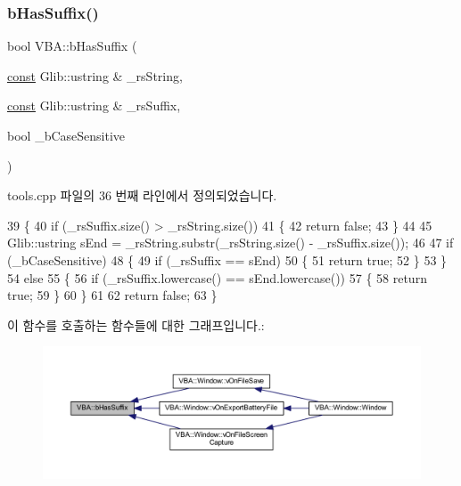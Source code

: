 \subsubsection{\texorpdfstring{b\+Has\+Suffix()}{bHasSuffix()}}
{\footnotesize\ttfamily bool V\+B\+A\+::b\+Has\+Suffix (\begin{DoxyParamCaption}\item[{\mbox{\hyperlink{getopt1_8c_a2c212835823e3c54a8ab6d95c652660e}{const}} Glib\+::ustring \&}]{\+\_\+rs\+String,  }\item[{\mbox{\hyperlink{getopt1_8c_a2c212835823e3c54a8ab6d95c652660e}{const}} Glib\+::ustring \&}]{\+\_\+rs\+Suffix,  }\item[{bool}]{\+\_\+b\+Case\+Sensitive }\end{DoxyParamCaption})}



tools.\+cpp 파일의 36 번째 라인에서 정의되었습니다.


\begin{DoxyCode}
39 \{
40   \textcolor{keywordflow}{if} (\_rsSuffix.size() > \_rsString.size())
41   \{
42     \textcolor{keywordflow}{return} \textcolor{keyword}{false};
43   \}
44 
45   Glib::ustring sEnd = \_rsString.substr(\_rsString.size() - \_rsSuffix.size());
46 
47   \textcolor{keywordflow}{if} (\_bCaseSensitive)
48   \{
49     \textcolor{keywordflow}{if} (\_rsSuffix == sEnd)
50     \{
51       \textcolor{keywordflow}{return} \textcolor{keyword}{true};
52     \}
53   \}
54   \textcolor{keywordflow}{else}
55   \{
56     \textcolor{keywordflow}{if} (\_rsSuffix.lowercase() == sEnd.lowercase())
57     \{
58       \textcolor{keywordflow}{return} \textcolor{keyword}{true};
59     \}
60   \}
61 
62   \textcolor{keywordflow}{return} \textcolor{keyword}{false};
63 \}
\end{DoxyCode}
이 함수를 호출하는 함수들에 대한 그래프입니다.\+:
\nopagebreak
\begin{figure}[H]
\begin{center}
\leavevmode
\includegraphics[width=350pt]{namespace_v_b_a_ad93561fe4528e04192e066e138c3572b_icgraph}
\end{center}
\end{figure}
\mbox{\label{namespace_v_b_a_a2a6c0188179e4ee017369e21d8e6f268}} 
